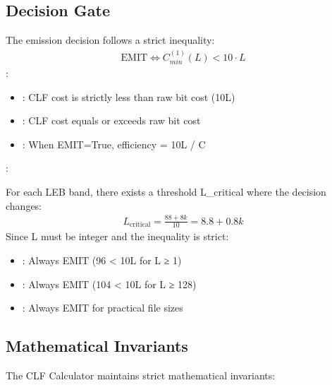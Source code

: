 \documentclass[letterpaper,10pt,english]{sphinxmanual}
\begin{document}
\subsection{Decision Gate}
\label{\detokenize{mathematical_foundation:decision-gate}}
\sphinxAtStartPar
The emission decision follows a strict inequality:
\begin{equation*}
\begin{split}\text{EMIT} \Leftrightarrow C_{min}^{(1)}(L) < 10 \cdot L\end{split}
\end{equation*}
\sphinxAtStartPar
{}:
\begin{itemize}
\item {} 
\sphinxAtStartPar
{}: CLF cost is strictly less than raw bit cost (10L)

\item {} 
\sphinxAtStartPar
{}: CLF cost equals or exceeds raw bit cost

\item {} 
\sphinxAtStartPar
{}: When EMIT=True, efficiency = 10L / C

\end{itemize}

\sphinxAtStartPar
{}:

\sphinxAtStartPar
For each LEB band, there exists a threshold L\_critical where the decision changes:
\begin{equation*}
\begin{split}L_{\text{critical}} = \frac{88 + 8k}{10} = 8.8 + 0.8k\end{split}
\end{equation*}
\sphinxAtStartPar
Since L must be integer and the inequality is strict:
\begin{itemize}
\item {} 
\sphinxAtStartPar
{}: Always EMIT (96 \textless{} 10L for L ≥ 1)

\item {} 
\sphinxAtStartPar
{}: Always EMIT (104 \textless{} 10L for L ≥ 128)

\item {} 
\sphinxAtStartPar
{}: Always EMIT for practical file sizes

\end{itemize}


\subsection{Mathematical Invariants}
\label{\detokenize{mathematical_foundation:mathematical-invariants}}
\sphinxAtStartPar
The CLF Calculator maintains strict mathematical invariants:
\end{document}
